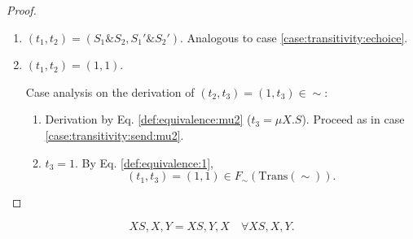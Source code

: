 \documentclass{llncs}
\newcommand*{\Trans}{\mathrm{Trans}}
\newcommand*{\sequiv}{\sim}
\newcommand*{\ichoice}{\mathop{\&}}
\newcommand*{\envimpl}       [2]{#1 \vdash #2}
\newcommand*{\envimplok}     [2]{\envimpl{#1}{\text{$#2$ {\normalfont \rmfamily ok}}}}
\renewcommand*{\|}{\;|\;}
\begin{document}
\begin{proof}
\begin{enumerate}
    \item
      \label{case:transitivity:ichoice}
      $(t_1, t_2) = (S_1 \ichoice S_2, S_1' \ichoice S_2')$. Analogous to
      case \ref{case:transitivity:echoice}.


    \item
      \label{case:transitivity:1}
      $(t_1, t_2) = (1, 1)$.

      Case analysis on the derivation of $(t_2, t_3) = (1, t_3) \in \sequiv$:
      \begin{enumerate}
        \item Derivation by Eq. \ref{def:equivalence:mu2} ($t_3 = \mu X.S$).
          Proceed as in case \ref{case:transitivity:send:mu2}.

        \item $t_3 = 1$. By Eq. \ref{def:equivalence:1},
          \begin{equation*}
            (t_1, t_3) = (1, 1) \in F_\sequiv(\Trans(\sequiv)).
          \end{equation*}
      \end{enumerate}

  \end{enumerate}
\end{proof}

\begin{lemma}
  \label{lemma:environment_variable_ordering}
  \begin{equation*}
    XS, X, Y = XS, Y, X \quad \forall XS, X, Y.
  \end{equation*}
\end{lemma}
\end{document}
